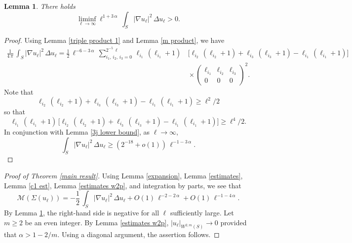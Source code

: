 \documentclass[11pt]{amsart}
\newtheorem{lemma}[theorem]{Lemma}
\theoremstyle {definition}
\newcommand{\cM}{\mathcal{M}}
\begin{document}
\begin{lemma}
	There holds \label{cubic term}
	$$
	\liminf_{\ell\to\infty} \ell^{1+3\,\alpha}\,\int_S|\nabla u_\ell|^2\,\Delta u_\ell>0.
	$$
\end{lemma} 
\begin{proof} 
Using  Lemma \ref{triple product 1} and Lemma \ref{m product}, we have 
\begin{align*} 
\frac{1}{4\,\pi}\,\int_S |\nabla u_\ell|^2\,\Delta u_\ell =\frac12\,\ell^{-6-3\,\alpha}\,\sum_{i_1,\,i_2,\,i_3=0}^{2^{-5}\,\ell}\,\ell_{i_1}\,(\ell_{i_1}+1)&\,\big[\ell_{i_2}\,(\ell_{i_2}+1)+\ell_{i_3}\,(\ell_{i_3}+1)-\ell_{i_1}\,(\ell_{i_1}+1)\big]\\&\,\times \begin{pmatrix} \ell_{i_1} & \ell_{i_2} &\ell_{i_3} \\
	0& 0 & 0
\end{pmatrix}^2.
\end{align*} 
Note that
$$
\ell_{i_2}\,(\ell_{i_2}+1)+\ell_{i_3}\,(\ell_{i_3}+1)-\ell_{i_1}\,(\ell_{i_1}+1)\geq \ell^2/2 
$$
so that 
$$
\ell_{i_1}\,(\ell_{i_1}+1)\,\big[\ell_{i_2}\,(\ell_{i_2}+1)+\ell_{i_3}\,(\ell_{i_3}+1)-\ell_{i_1}\,(\ell_{i_1}+1)\big]\geq \ell^4/2.
$$
In conjunction with Lemma \ref{3j lower bound},  as $\ell\to\infty$,
$$
\int_S |\nabla u_\ell|^2\,\Delta u_\ell\geq  \left(2^{-18}+o(1)\right)\,\ell^{-1-3\,\alpha}.
$$ 
\end{proof} 
\begin{proof}[Proof of Theorem \ref{main result}]
	Using Lemma \ref{expansion}, Lemma \ref{estimates}, Lemma \ref{c1 est},  Lemma \ref{estimates w2p}, and integration by parts, we see that
	$$
	\cM(\Sigma(u_\ell))=-\frac12\,\int_S |\nabla u_\ell|^2\,\Delta u_\ell+O(1)\,\ell^{-2-2\,\alpha}+O(1)\,\ell^{-1-4\,\alpha}.
	$$
	By Lemma \ref{cubic term}, the right-hand side is negative for all $\ell$   sufficiently large. 
Let $m\geq 2$ be an even integer. By Lemma \ref{estimates w2p},
	$
	|u_\ell|_{W^{2,m}(S)}\to 0
	$ provided that $\alpha>1-2/m$. Using a diagonal argument, the assertion follows.
\end{proof} 
\end{document}
